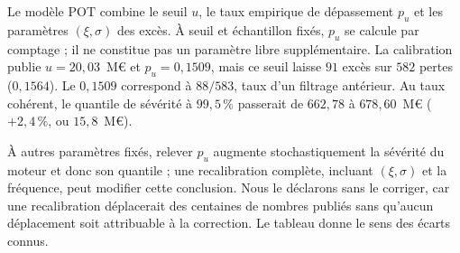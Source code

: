 Le modèle POT combine le seuil $u$, le taux empirique de dépassement $p_u$ et les paramètres $(\xi,\sigma)$ des excès. À seuil et échantillon fixés, $p_u$ se calcule par comptage ; il ne constitue pas un paramètre libre supplémentaire. La
calibration publie $u=20{,}03$~M\euro{} et $p_u=0{,}1509$, mais ce seuil laisse $91$ excès sur
$582$ pertes ($0{,}1564$). Le $0{,}1509$ correspond à $88/583$, taux d'un filtrage antérieur. Au
taux cohérent, le quantile de sévérité à $99{,}5\,\%$ passerait de $662{,}78$ à $678{,}60$~M\euro{}
($+2{,}4\,\%$, ou $15{,}8$~M\euro).

À autres paramètres fixés, relever $p_u$ augmente stochastiquement la sévérité du moteur et donc son quantile ; une recalibration complète, incluant $(\xi,\sigma)$ et la fréquence, peut modifier cette conclusion. Nous
le déclarons sans le corriger, car une recalibration déplacerait des
centaines de nombres publiés sans qu'aucun déplacement soit attribuable à la correction. Le tableau
donne le sens des écarts connus.


